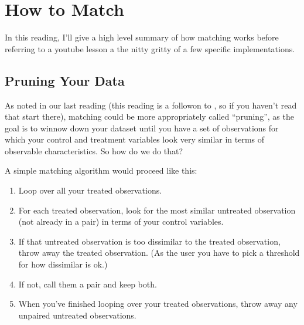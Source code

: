 \documentclass[letterpaper,10pt,english]{jupyterBook}
\begin{document}
\sphinxstepscope


\section{How to Match}
\label{\detokenize{35_causal/90_matching_how:how-to-match}}\label{\detokenize{35_causal/90_matching_how::doc}}
\sphinxAtStartPar
In this reading, I’ll give a high level summary of how matching works before referring to a youtube lesson a the nitty gritty of a few specific implementations.


\subsection{Pruning Your Data}
\label{\detokenize{35_causal/90_matching_how:pruning-your-data}}
\sphinxAtStartPar
As noted in our last reading (this reading is a follow\sphinxhyphen{}on to , so if you haven’t read that start there), matching could be more appropriately called “pruning”, as the goal is to winnow down your dataset until you have a set of observations for which your control and treatment variables look very similar in terms of observable characteristics. So how do we do that?

\sphinxAtStartPar
A simple matching algorithm would proceed like this:
\begin{enumerate}
%
\item {} 
\sphinxAtStartPar
Loop over all your treated observations.

\item {} 
\sphinxAtStartPar
For each treated observation, look for the most similar untreated observation (not already in a pair) in terms of your control variables.

\item {} 
\sphinxAtStartPar
If that untreated observation is too dissimilar to the treated observation, throw away the treated observation. (As the user you have to pick a threshold for how dissimilar is ok.)

\item {} 
\sphinxAtStartPar
If not, call them a pair and keep both.

\item {} 
\sphinxAtStartPar
When you’ve finished looping over your treated observations, throw away any unpaired untreated observations.

\end{enumerate}
\end{document}
